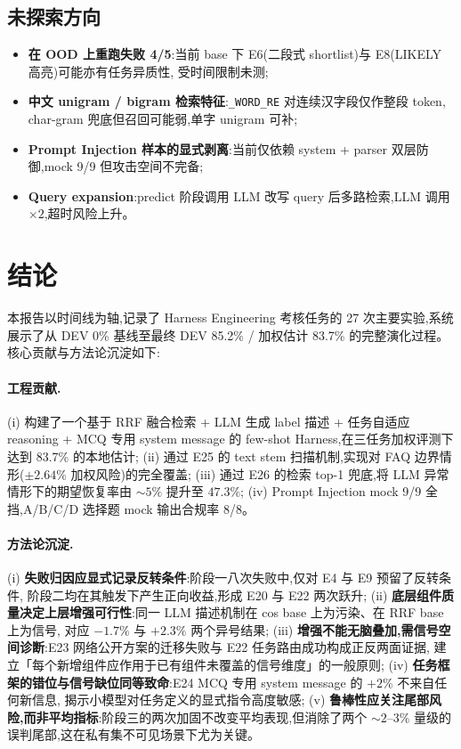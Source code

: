 \documentclass[11pt,a4paper]{ctexart}
\begin{document}
\subsection{未探索方向}

\begin{itemize}[leftmargin=2em,itemsep=0.1em]
\item \textbf{在 OOD 上重跑失败 4/5}:当前 base 下 E6(二段式 shortlist)与 E8(LIKELY 高亮)可能亦有任务异质性,
  受时间限制未测;
\item \textbf{中文 unigram / bigram 检索特征}:\texttt{\_WORD\_RE} 对连续汉字段仅作整段 token,
  char-gram 兜底但召回可能弱,单字 unigram 可补;
\item \textbf{Prompt Injection 样本的显式剥离}:当前仅依赖 system + parser 双层防御,mock 9/9 但攻击空间不完备;
\item \textbf{Query expansion}:predict 阶段调用 LLM 改写 query 后多路检索,LLM 调用 $\times 2$,超时风险上升。
\end{itemize}

\section{结论}\label{sec:conclusion}

本报告以时间线为轴,记录了 Harness Engineering 考核任务的 27 次主要实验,系统展示了从 DEV 0\% 基线至最终
DEV 85.2\% / 加权估计 83.7\% 的完整演化过程。核心贡献与方法论沉淀如下:

\paragraph{工程贡献.}
(i) 构建了一个基于 RRF 融合检索 + LLM 生成 label 描述 + 任务自适应 reasoning + MCQ 专用 system message
的 few-shot Harness,在三任务加权评测下达到 83.7\% 的本地估计;
(ii) 通过 E25 的 text stem 扫描机制,实现对 FAQ 边界情形($\pm 2.64\%$ 加权风险)的完全覆盖;
(iii) 通过 E26 的检索 top-1 兜底,将 LLM 异常情形下的期望恢复率由 $\sim 5\%$ 提升至 $47.3\%$;
(iv) Prompt Injection mock 9/9 全挡,A/B/C/D 选择题 mock 输出合规率 8/8。

\paragraph{方法论沉淀.}
(i) \textbf{失败归因应显式记录反转条件}:阶段一八次失败中,仅对 E4 与 E9 预留了反转条件,
阶段二均在其触发下产生正向收益,形成 E20 与 E22 两次跃升;
(ii) \textbf{底层组件质量决定上层增强可行性}:同一 LLM 描述机制在 cos base 上为污染、在 RRF base 上为信号,
对应 $-1.7\%$ 与 $+2.3\%$ 两个异号结果;
(iii) \textbf{增强不能无脑叠加,需信号空间诊断}:E23 网络公开方案的迁移失败与 E22 任务路由成功构成正反两面证据,
建立「每个新增组件应作用于已有组件未覆盖的信号维度」的一般原则;
(iv) \textbf{任务框架的错位与信号缺位同等致命}:E24 MCQ 专用 system message 的 $+2\%$ 不来自任何新信息,
揭示小模型对任务定义的显式指令高度敏感;
(v) \textbf{鲁棒性应关注尾部风险,而非平均指标}:阶段三的两次加固不改变平均表现,但消除了两个
$\sim 2$--$3\%$ 量级的误判尾部,这在私有集不可见场景下尤为关键。
\end{document}
